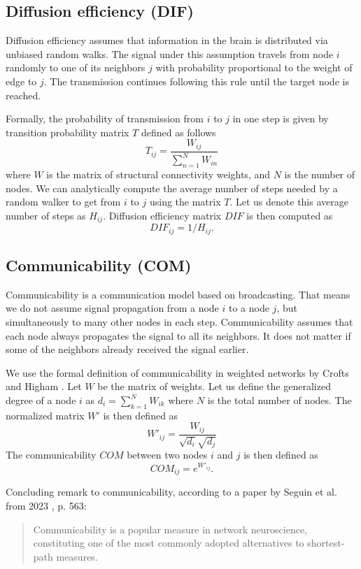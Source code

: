 \subsection{Diffusion efficiency (DIF)}

Diffusion efficiency assumes that information in the brain is distributed via unbiased random walks. The signal under this assumption travels from node $i$ randomly to one of its neighbors $j$ with probability proportional to the weight of edge to $j$. The transmission continues following this rule until the target node is reached. \cite{seguin_communication_2023,seguin_brain_2023}

Formally, the probability of transmission from $i$ to $j$ in one step is given by transition probability matrix $T$ defined as follows 
$$
T_{ij} = \frac{W_{ij}}{\sum_{n=1}^N W_{in}}
$$
where $W$ is the matrix of structural connectivity weights, and $N$ is the number of nodes. We can analytically compute the average number of steps needed by a random walker to get from $i$ to $j$ using the matrix $T$. Let us denote this average number of steps as $H_{ij}$. Diffusion efficiency matrix $DIF$ is then computed as 
$$
DIF_{ij}=1/H_{ij}.
$$

\subsection{Communicability (COM)}

Communicability is a communication model based on broadcasting. That means we do not assume signal propagation from a node $i$ to a node $j$, but simultaneously to many other nodes in each step. Communicability assumes that each node always propagates the signal to all its neighbors. It does not matter if some of the neighbors already received the signal earlier. \cite{seguin_communication_2023,seguin_brain_2023}

We use the formal definition of communicability in weighted networks by Crofts and Higham \cite{crofts_weighted_2009}. Let $W$ be the matrix of weights. Let us define the generalized degree of a node $i$ as $d_i = \sum_{k=1}^N W_{ik}$ where $N$ is the total number of nodes. The normalized matrix $W'$ is then defined as 
$$
W'_{ij} = \frac{W_{ij}}{\sqrt{d_i}\sqrt{d_j}}
$$
The communicability $COM$ between two nodes $i$ and $j$ is then defined as
$$
COM_{ij} = e^{W'_{ij}}.
$$

Concluding remark to communicability, according to a paper by Seguin et al. from 2023 \cite{seguin_brain_2023}, p. 563:
\begin{quote}
Communicability is a popular measure in network neuroscience, constituting one of the most commonly adopted alternatives to shortest-path measures.
\end{quote}

